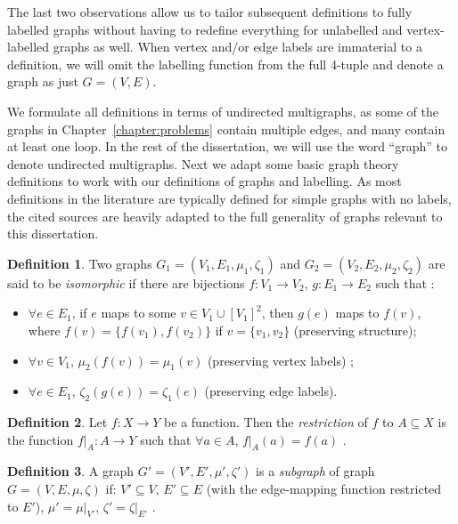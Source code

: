 \documentclass{l4proj}
\theoremstyle{definition}
\newtheorem{definition}{Definition}[chapter]
\theoremstyle{remark}
\begin{document}
The last two observations allow us to tailor subsequent definitions to fully
labelled graphs without having to redefine everything for unlabelled and
vertex-labelled graphs as well. When vertex and/or edge labels are immaterial to
a definition, we will omit the labelling function from the full 4-tuple and
denote a graph as just $G = (V, E)$.

We formulate all definitions in terms of undirected multigraphs, as some of the
graphs in Chapter~\ref{chapter:problems} contain multiple edges, and many contain
at least one loop. In the rest of the dissertation, we will use the word
``graph'' to denote undirected multigraphs. Next we adapt some basic graph
theory definitions to work with our definitions of graphs and labelling. As most
definitions in the literature are typically defined for simple graphs with no
labels, the cited sources are heavily adapted to the full generality of graphs
relevant to this dissertation.

\begin{definition}
  Two graphs $G_1 = (V_1, E_1, \mu_1, \zeta_1)$ and $G_2 = (V_2, E_2, \mu_2,
  \zeta_2)$ are said to be \emph{isomorphic} if there are bijections $f \colon
  V_1 \to V_2$, $g \colon E_1 \to E_2$ such that
  \cite{DBLP:journals/jcamd/RaymondW02a}:
  \begin{itemize}
  \item $\forall e \in E_1$, if $e$ maps to some $v \in V_1 \cup [V_1]^2$, then
    $g(e)$ maps to $f(v)$, where $f(v) = \{ f(v_1), f(v_2) \}$ if $v = \{ v_1,
    v_2 \}$ (preserving structure);
  \item $\forall v \in V_1$, $\mu_2(f(v)) = \mu_1(v)$ (preserving vertex labels)
    \cite{DBLP:journals/siamcomp/BabaiES80};
  \item $\forall e \in E_1$, $\zeta_2(g(e)) = \zeta_1(e)$ (preserving edge
    labels).
  \end{itemize}
\end{definition}

\begin{definition}
  Let $f \colon X \to Y$ be a function. Then the \emph{restriction} of $f$ to $A
  \subseteq X$ is the function $f|_A \colon A \to Y$ such that $\forall a \in A$,
  $f|_A(a) = f(a)$ \cite{stoll1979set}.
\end{definition}

\begin{definition} A graph $G' = (V', E', \mu', \zeta')$ is a
  \emph{subgraph} of graph $G = (V, E, \mu, \zeta)$ if: $V' \subseteq V$, $E'
  \subseteq E$ (with the edge-mapping function restricted to $E'$), $\mu' =
  \mu|_{V'}$, $\zeta' = \zeta|_{E'}$ \cite{DBLP:books/daglib/0030488}.
\end{definition}
\end{document}
